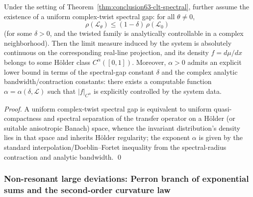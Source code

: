 \begin{corollary}[Uniform complex-twist spectral gap \texorpdfstring{$\Rightarrow$}{=>} H\"older regularity of the limit density]\label{cor:conclusion64-holder-regularity}
Under the setting of Theorem~\ref{thm:conclusion63-clt-spectral}, further assume the existence of a uniform complex-twist spectral gap: for all \(\theta\neq 0\),
\[
\rho(\mathcal{L}_{\theta})\le (1-\delta)\,\rho(\mathcal{L}_0)
\]
(for some \(\delta>0\), and the twisted family is analytically controllable in a complex neighborhood).
Then the limit measure induced by the system is absolutely continuous on the corresponding real-line projection, and its density \(f=d\mu/dx\) belongs to some H\"older class \(C^{\alpha}([0,1])\).
Moreover, \(\alpha>0\) admits an explicit lower bound in terms of the spectral-gap constant \(\delta\) and the complex analytic bandwidth/contraction constants: there exists a computable function \(\alpha=\alpha(\delta,\mathcal{L})\) such that \(|f|_{C^{\alpha}}\) is explicitly controlled by the system data.
\end{corollary}

\begin{proof}
A uniform complex-twist spectral gap is equivalent to uniform quasi-compactness and spectral separation of the transfer operator on a H\"older (or suitable anisotropic Banach) space, whence the invariant distribution's density lies in that space and inherits H\"older regularity; the exponent \(\alpha\) is given by the standard interpolation/Doeblin--Fortet inequality from the spectral-radius contraction and analytic bandwidth. \qed
\end{proof}

\subsubsection{Non-resonant large deviations: Perron branch of exponential sums and the second-order curvature law}


